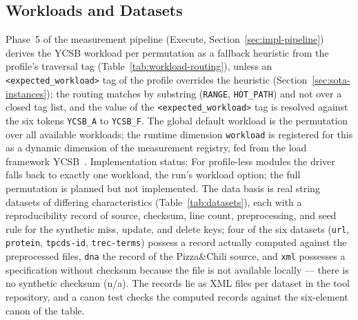 \begin{nurlang}
\subsection{Workloads and Datasets}\label{sec:eval-workloads}
Phase~5 of the measurement pipeline (Execute, Section~\ref{sec:impl-pipeline}) derives the YCSB
workload per permutation as a fallback heuristic from the profile's traversal tag
(Table~\ref{tab:workload-routing}), unless an \texttt{<expected\_workload>} tag of the profile
overrides the heuristic (Section~\ref{sec:sota-instances}); the routing matches by substring
(\texttt{RANGE}, \texttt{HOT\_PATH}) and not over a closed tag list, and the value of the
\texttt{<expected\_workload>} tag is resolved against the six tokens \texttt{YCSB\_A} to
\texttt{YCSB\_F}. The global default workload is the permutation over all available workloads; the
runtime dimension \texttt{workload} is registered for this as a dynamic dimension of the measurement
registry, fed from the load framework YCSB~\cite{cooper2010ycsb}. Implementation status: For
profile-less modules the driver falls back to exactly one workload, the run's workload option; the
full permutation is planned but not implemented. The data basis is real string datasets of differing
characteristics (Table~\ref{tab:datasets}), each with a reproducibility record of source, checksum,
line count, preprocessing, and seed rule for the synthetic miss, update, and delete keys; four of the
six datasets (\texttt{url}, \texttt{protein}, \texttt{tpcds-id}, \texttt{trec-terms}) possess a
record actually computed against the preprocessed files, \texttt{dna} the record of the
Pizza\&Chili source, and \texttt{xml} possesses a specification without checksum because the file is
not available locally --- there is no synthetic checksum (n/a). The records lie as XML files per
dataset in the tool repository, and a canon test checks the computed records against the six-element
canon of the table.
\end{nurlang}
